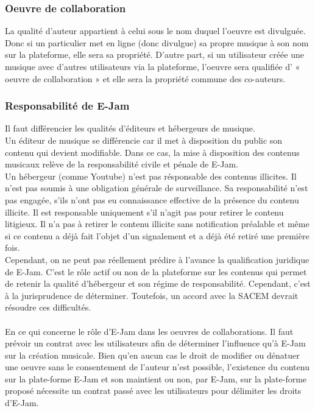 \documentclass[a4,12pt]{article}
\begin{document}
\subsubsection{Oeuvre de collaboration}
La qualité d’auteur appartient à celui sous le nom duquel l’oeuvre est divulguée.\\
Donc si un particulier met en ligne (donc divulgue) sa propre musique à son nom sur la plateforme, elle sera sa propriété. D’autre part, si un utilisateur créée une musique avec d’autres utilisateurs via la plateforme, l’oeuvre sera qualifiée d’ « oeuvre de collaboration » et elle sera la propriété commune des co-auteurs.
\subsubsection{Responsabilité de E-Jam}
Il faut différencier les qualités d'éditeurs et hébergeurs de musique.\\
Un éditeur de musique se différencie car il met à disposition du public son contenu qui devient modifiable. Dans ce cas, la mise à disposition des contenus musicaux relève de la responsabilité civile et pénale de E-Jam.\\
Un hébergeur (comme Youtube) n'est pas résponsable des contenus illicites. Il n'est pas soumis à une obligation générale de surveillance. Sa responsabilité n'est pas engagée, s'ils n'ont pas eu connaissance effective de la présence du contenu illicite. Il est responsable uniquement s'il n'agit pas pour retirer le contenu litigieux. Il n'a pas à retirer le contenu illicite sans notification préalable et même si ce contenu a déjà fait l'objet d'un signalement et a déjà été retiré une première fois.\\
Cependant, on ne peut pas réellement prédire à l'avance la qualification juridique de E-Jam. C'est le rôle actif ou non de la plateforme sur les contenus qui permet de retenir la qualité d'hébergeur et son régime de responsabilité. Cependant, c'est à la jurisprudence de déterminer. Toutefois, un accord avec la SACEM devrait résoudre ces difficultés.\\
\\
En ce qui concerne le rôle d'E-Jam dans les oeuvres de collaborations. Il faut prévoir un contrat avec les utilisateurs afin de déterminer l'influence qu'à E-Jam sur la création musicale. Bien qu'en aucun cas le droit de modifier ou dénatuer une oeuvre sans le consentement de l'auteur n'est possible, l'existence du contenu sur la plate-forme E-Jam et son maintient ou non, par E-Jam, sur la plate-forme proposé nécessite un contrat passé avec les utilisateurs pour délimiter les droits d'E-Jam.
\newpage
\end{document}

